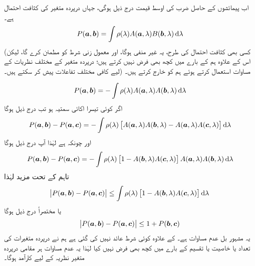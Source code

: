  اب پیمائشوں کے  حاصل ضرب کی اوسط قیمت درج ذیل ہوگی،  جہاں  درپردہ متغیر کی کثافت احتمال ہے۔
\begin{align}
	P(\kvec{a}, \kvec{b}) = \int\rho(\lambda)A(\kvec{a}, \lambda)B(\kvec{b}, \lambda)\dif\lambda
\end{align}
(کسی بھی کثافت  احتمال کی طرح،  یہ غیر منفی ہوگا،  اور معمول زنی شرط  کو مطمئن کرے گا،  لیکن  اس کے علاوہ ہم  کے بارے میں کچھ بھی فرض نہیں کرتے ہیں؛  درپردہ متغیر کے مختلف نظریات  کے لیے کافی مختلف تفاعلات پیش کر سکتے ہیں۔) مساوات     استعمال کرتے ہوئے ہم  کو خارج کرتے ہیں۔


\begin{align}
	P(\kvec{a}, \kvec{b}) = -\int\rho(\lambda)A(\kvec{a}, \lambda)A(\kvec{b}, \lambda)\dif\lambda
\end{align}
اگر  کوئی تیسرا اکائی سمتیہ ہو تب درج ذیل ہوگا
\begin{align}
	P(\kvec{a}, \kvec{b})-P(\kvec{a}, \kvec{c}) = -\int\rho(\lambda)\left[A(\kvec{a}, \lambda)A(\kvec{b}, \lambda)-A(\kvec{a}, \lambda)A(\kvec{c}, \lambda)\right]\dif\lambda
\end{align}
اور چونکہ  ہے لہٰذا   آپ درج ذیل ہوگا 
\begin{align}
	P(\kvec{a}, \kvec{b})-P(\kvec{a}, \kvec{c}) =-\int\rho(\lambda)\left[1-A(\kvec{b}, \lambda)A(\kvec{c}, \lambda)\right]A(\kvec{a}, \lambda)A(\kvec{b}, \lambda)\dif\lambda
\end{align}
تاہم  کے تحت  مزید  لہٰذا 
\begin{align}
	\abs{P(\kvec{a}, \kvec{b})-P(\kvec{a},\kvec{c})}\leq\int\rho(\lambda)\left[1-A(\kvec{b}, \lambda)A(\kvec{c}, \lambda)\right]\dif\lambda
\end{align}
یا مختصراً درج ذیل ہوگا
\begin{align}
	\abs{P({{\boldsymbol{a}}}, {{\boldsymbol{b}}})-P({{\boldsymbol{a}}}, {{\boldsymbol{c}}})}\leq1+P({{\boldsymbol{b}}}, {{\boldsymbol{c}}})
\end{align}
یہ مشہور بل عدم مساوات ہے۔  کے علاوہ کوئی شرط عائد نہیں کی گئی ہے ہم نے درپردہ متغیرات کی تعداد یا خاصیت یا تقسیم  کے بارے میں کچھ بھی فرض نہیں کیا لہٰذا یہ عدم مساوات ہر مقامی درپردہ متغیر نظریہ کے لیے کارآمد ہوگا۔


